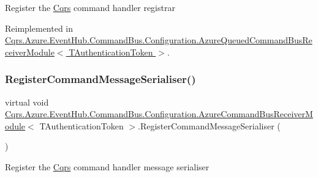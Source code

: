 Register the \hyperlink{namespaceCqrs}{Cqrs} command handler registrar 



Reimplemented in \hyperlink{classCqrs_1_1Azure_1_1EventHub_1_1CommandBus_1_1Configuration_1_1AzureQueuedCommandBusReceiverModule_a30d8ea5555bbb38bfddc6b5aa1e3dd1c_a30d8ea5555bbb38bfddc6b5aa1e3dd1c}{Cqrs.\+Azure.\+Event\+Hub.\+Command\+Bus.\+Configuration.\+Azure\+Queued\+Command\+Bus\+Receiver\+Module$<$ T\+Authentication\+Token $>$}.

\mbox{\label{classCqrs_1_1Azure_1_1EventHub_1_1CommandBus_1_1Configuration_1_1AzureCommandBusReceiverModule_a03805080424e87926083c35d45ffc550_a03805080424e87926083c35d45ffc550}} 
\subsubsection{\texorpdfstring{Register\+Command\+Message\+Serialiser()}{RegisterCommandMessageSerialiser()}}
{\footnotesize\ttfamily virtual void \hyperlink{classCqrs_1_1Azure_1_1EventHub_1_1CommandBus_1_1Configuration_1_1AzureCommandBusReceiverModule}{Cqrs.\+Azure.\+Event\+Hub.\+Command\+Bus.\+Configuration.\+Azure\+Command\+Bus\+Receiver\+Module}$<$ T\+Authentication\+Token $>$.Register\+Command\+Message\+Serialiser (\begin{DoxyParamCaption}{ }\end{DoxyParamCaption})\hspace{0.3cm}{\ttfamily [virtual]}}



Register the \hyperlink{namespaceCqrs}{Cqrs} command handler message serialiser 

